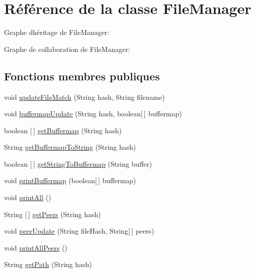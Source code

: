 \hypertarget{classFileManager}{}\section{Référence de la classe File\+Manager}
\label{classFileManager}


Graphe d\textquotesingle{}héritage de File\+Manager\+:


Graphe de collaboration de File\+Manager\+:
\subsection*{Fonctions membres publiques}
\begin{DoxyCompactItemize}
\item 
void \hyperlink{classFileManager_a907bacc448d9077430f89e8304f75db8}{update\+File\+Match} (String hash, String filename)
\item 
void \hyperlink{classFileManager_a4be2735045c292bf7a0e0680bd01b309}{buffermap\+Update} (String hash, boolean\mbox{[}$\,$\mbox{]} buffermap)
\item 
boolean \mbox{[}$\,$\mbox{]} \hyperlink{classFileManager_a6f00a2b4ff073d49229b469f3971445d}{get\+Buffermap} (String hash)
\item 
String \hyperlink{classFileManager_a2729300742a161f49b48d6ffac61d460}{get\+Buffermap\+To\+String} (String hash)
\item 
boolean \mbox{[}$\,$\mbox{]} \hyperlink{classFileManager_a1c9d6d3f954b6edac5a4542dcedc3aad}{get\+String\+To\+Buffermap} (String buffer)
\item 
void \hyperlink{classFileManager_ae91ea295ea5951ecab2d249ea1c2f8e7}{print\+Buffermap} (boolean\mbox{[}$\,$\mbox{]} buffermap)
\item 
void \hyperlink{classFileManager_a902e9eeb706da69a9611d04172b945fd}{print\+All} ()
\item 
String \mbox{[}$\,$\mbox{]} \hyperlink{classFileManager_a58104212e362f362702ff179c484f4c8}{get\+Peers} (String hash)
\item 
void \hyperlink{classFileManager_a39b7d3eb829e3ecc259c4da41aa38656}{peer\+Update} (String file\+Hash, String\mbox{[}$\,$\mbox{]} peers)
\item 
void \hyperlink{classFileManager_a1ff7d7a1192210cc29a88609b9c1844d}{print\+All\+Peers} ()
\item 
String \hyperlink{classFileManager_a38d375f288f94fe973ef2352fe7f2e25}{get\+Path} (String hash)
\item 

\end{DoxyCompactItemize}
